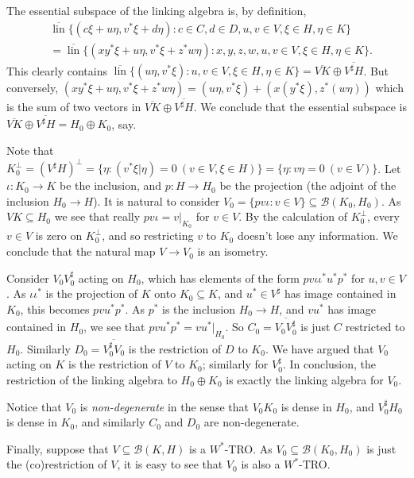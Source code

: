 \documentclass[a4paper,11pt]{article}
\theoremstyle{plain}
\theoremstyle{remark}
\newcommand{\mc}[1]{\mathcal{#1}}
\newcommand{\lin}{\operatorname{lin}}
\begin{document}
The essential subspace of the linking algebra is, by definition,
\begin{align*}
& \overline{\lin}\big\{ (c\xi+u\eta, v^*\xi+d\eta) : c\in C, d\in D, u,v\in V, \xi\in H, \eta\in K \big\}   \\
&= \overline{\lin}\big\{ (xy^*\xi+u\eta, v^*\xi+z^*w\eta) : x,y,z,w,u,v\in V, \xi\in H, \eta\in K \big\}.
\end{align*}
This clearly contains $\overline{\lin} \{ (u\eta, v^*\xi) : u,v\in V, \xi\in H, \eta\in K \} = \overline{V K} \oplus \overline{V^\sharp H}$.  But conversely, $(xy^*\xi+u\eta, v^*\xi+z^*w\eta) = (u\eta, v^*\xi) + (x(y^*\xi), z^*(w\eta))$ which is the sum of two vectors in $\overline{V K} \oplus \overline{V^\sharp H}$.  We conclude that the essential subspace is $\overline{V K} \oplus \overline{V^\sharp H} = H_0 \oplus K_0$, say.

Note that $K_0^\perp = (V^\sharp H)^\perp = \{ \eta : (v^*\xi|\eta)=0 \ (v\in V, \xi\in H) \} = \{ \eta : v\eta=0 \ (v\in V) \}$.  Let $\iota \colon K_0 \to K$ be the inclusion, and $p\colon H\to H_0$ be the projection (the adjoint of the inclusion $H_0\to H$).  It is natural to consider $V_0 = \{ pv\iota : v\in V \} \subseteq \mc B(K_0, H_0)$.  As $V K \subseteq H_0$ we see that really $pv\iota = v|_{K_0}$ for $v\in V$.  By the calculation of $K_0^\perp$, every $v\in V$ is zero on $K_0^\perp$, and so restricting $v$ to $K_0$ doesn't lose any information.  We conclude that the natural map $V \to V_0$ is an isometry.

Consider $V_0 V_0^\sharp$ acting on $H_0$, which has elements of the form $p v \iota \iota^* u^* p^*$ for $u,v\in V$.  As $\iota \iota^*$ is the projection of $K$ onto $K_0\subseteq K$, and $u^* \in V^\sharp$ has image contained in $K_0$, this becomes $p vu^* p^*$.  As $p^*$ is the inclusion $H_0\to H$, and $vu^*$ has image contained in $H_0$, we see that $p vu^* p^* = vu^* |_{H_0}$.  So $C_0 = \overline{ V_0 V_0^\sharp }$ is just $C$ restricted to $H_0$.  Similarly $D_0 = \overline{ V_0^\sharp V_0 }$ is the restriction of $D$ to $K_0$.  We have argued that $V_0$ acting on $K$ is the restriction of $V$ to $K_0$; similarly for $V_0^\sharp$.  In conclusion, the restriction of the linking algebra to $H_0 \oplus K_0$ is exactly the linking algebra for $V_0$.

Notice that $V_0$ is \emph{non-degenerate} in the sense that $V_0K_0$ is dense in $H_0$, and $V_0^\sharp H_0$ is dense in $K_0$, and similarly $C_0$ and $D_0$ are non-degenerate.

Finally, suppose that $V \subseteq \mc B(K,H)$ is a $W^*$-TRO.  As $V_0 \subseteq \mc B(K_0, H_0)$ is just the (co)restriction of $V$, it is easy to see that $V_0$ is also a $W^*$-TRO.
\end{document}
